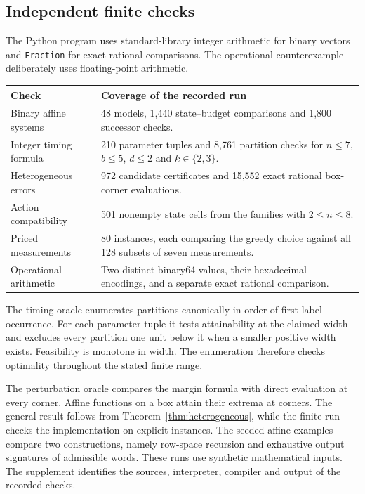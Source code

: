 \subsection{Independent finite checks}
The Python program uses standard-library integer arithmetic for binary vectors and \texttt{Fraction} for exact rational comparisons. The operational counterexample deliberately uses floating-point arithmetic.
\begin{longtable}{p{}p{}}
\toprule Check & Coverage of the recorded run\\\midrule\endhead
Binary affine systems & 48 models, 1,440 state--budget comparisons and 1,800 successor checks.\\
Integer timing formula & 210 parameter tuples and 8,761 partition checks for $n\le7$, $b\le5$, $d\le2$ and $k\in\{2,3\}$.\\
Heterogeneous errors & 972 candidate certificates and 15,552 exact rational box-corner evaluations.\\
Action compatibility & 501 nonempty state cells from the families with $2\le n\le8$.\\
Priced measurements & 80 instances, each comparing the greedy choice against all 128 subsets of seven measurements.\\
Operational arithmetic & Two distinct binary64 values, their hexadecimal encodings, and a separate exact rational comparison.\\
\bottomrule
\end{longtable}

The timing oracle enumerates partitions canonically in order of first label occurrence. For each parameter tuple it tests attainability at the claimed width and excludes every partition one unit below it when a smaller positive width exists. Feasibility is monotone in width. The enumeration therefore checks optimality throughout the stated finite range.

The perturbation oracle compares the margin formula with direct evaluation at every corner. Affine functions on a box attain their extrema at corners. The general result follows from Theorem~\ref{thm:heterogeneous}, while the finite run checks the implementation on explicit instances. The seeded affine examples compare two constructions, namely row-space recursion and exhaustive output signatures of admissible words. These runs use synthetic mathematical inputs. The supplement identifies the sources, interpreter, compiler and output of the recorded checks.

